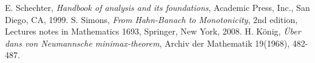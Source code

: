 \documentclass[a4paper,11pt]{book}
\begin{document}
	
\tableofcontents
%

%
%
%
%
%
%
%
%
%
%

















\nocite{*}
% 
% 
\begin{thebibliography}{X}
	 E. Schechter,
	\textsl{Handbook of analysis and its foundations}, Academic Press, Inc., San Diego, CA, 1999.
	 S. Simons, \textsl{From Hahn-Banach to Monotonicity}, 2nd edition, Lectures notes in Mathematics 1693, Springer, New York, 2008.
	 H. König, \textsl{Über dans von Neumannsche minimax-theorem}, Archiv der Mathematik 19(1968), 482-487.
\end{thebibliography}

%
%
%
%
%
%
%
%
%
%
%
%
%
%
%
%
%
%
%
%
%
\end{document}
